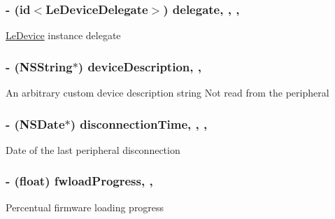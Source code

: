 \subsubsection[{delegate}]{\setlength{\rightskip}{0pt plus 5cm}-\/ (id$<${\bf Le\+Device\+Delegate}$>$) delegate\hspace{0.3cm}{\ttfamily [read]}, {\ttfamily [write]}, {\ttfamily [nonatomic]}, {\ttfamily [strong]}}\label{interface_le_device_a2abdc1b24d840bccd2f8bb590e726306}
\hyperlink{interface_le_device}{Le\+Device} instance delegate \hypertarget{interface_le_device_af434656f02c5a0db4cb796338be698f8}{}
\subsubsection[{device\+Description}]{\setlength{\rightskip}{0pt plus 5cm}-\/ (N\+S\+String$\ast$) device\+Description\hspace{0.3cm}{\ttfamily [read]}, {\ttfamily [nonatomic]}, {\ttfamily [assign]}}\label{interface_le_device_af434656f02c5a0db4cb796338be698f8}
An arbitrary custom device description string Not read from the peripheral \hypertarget{interface_le_device_a946e776be58c2aa7832d11821cd3081a}{}
\subsubsection[{disconnection\+Time}]{\setlength{\rightskip}{0pt plus 5cm}-\/ (N\+S\+Date$\ast$) disconnection\+Time\hspace{0.3cm}{\ttfamily [read]}, {\ttfamily [write]}, {\ttfamily [nonatomic]}, {\ttfamily [strong]}}\label{interface_le_device_a946e776be58c2aa7832d11821cd3081a}
Date of the last peripheral disconnection \hypertarget{interface_le_device_a6369f54b2d1aea6a257483e9021499fc}{}
\subsubsection[{fwload\+Progress}]{\setlength{\rightskip}{0pt plus 5cm}-\/ (float) fwload\+Progress\hspace{0.3cm}{\ttfamily [read]}, {\ttfamily [nonatomic]}, {\ttfamily [assign]}}\label{interface_le_device_a6369f54b2d1aea6a257483e9021499fc}
Percentual firmware loading progress \hypertarget{interface_le_device_a56486348e92a0d5807a47e306a1cecd3}{}

